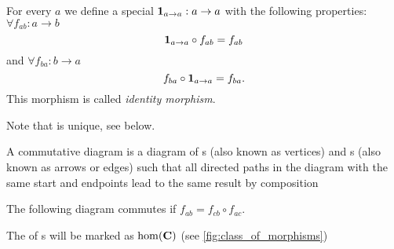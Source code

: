 \begin{definition}
  \label{def:id}
  For every  $a$ we define a special
   $\mathbf{1}_{ a \to a } : a \rightarrow a$ with the
  following properties: $\forall f_{ab} : a \rightarrow b$
  \begin{equation}
    \mathbf{1}_{ a \to a } \circ f_{ab} = f_{ab}
    \label{eq:leftid}
  \end{equation}
  and
  $\forall f_{ba} : b \rightarrow a$
  \begin{equation}
    f_{ba} \circ \mathbf{1}_{ a \to a }  = f_{ba}.
    \label{eq:rightid}
  \end{equation}
  This morphism is called \textit{identity morphism}.
\end{definition}

Note that  is unique, see
 below.

\begin{definition}
  A commutative diagram is a diagram of s (also known as
  vertices) and s (also known as arrows or
  edges) such that all directed paths in the diagram with the same
  start and endpoints lead to the same result by composition
  \label{def:commutative_diagram}

  The following diagram commutes if $f_{ab} = f_{cb} \circ f_{ac}$.

  \begin{center}
  \end{center}
\end{definition}


\begin{remark}
  \label{rem:morphclass}
  The  of s will be marked as 
  $\mathrm{hom}(\mathbf{C})$ (see \cref{fig:class_of_morphisms})
\end{remark}

